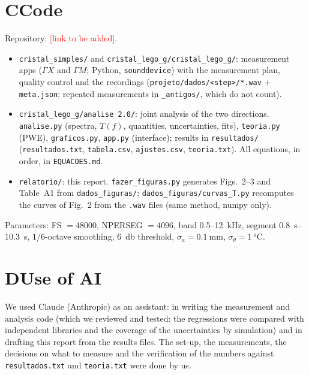 \documentclass[9pt,a4paper,twocolumn]{extarticle}
\newcommand{\umm}{\milli\metre}
\newcommand{\ukHz}{\kilo\hertz}
\newcommand{\udB}{\decibel}
\newcommand{\us}{\second}
\newcommand{\GX}{\ensuremath{\Gamma X}}
\newcommand{\GM}{\ensuremath{\Gamma M}}
\begin{document}
\section*{C\quad Code}
Repository: \textcolor{red}{[link to be added]}.
\begin{itemize}\setlength{\itemsep}{0pt}
\item \texttt{cristal\_simples/} and \texttt{cristal\_lego\_g/cristal\_lego\_g/}: measurement apps (\GX{} and \GM; Python, \texttt{sounddevice}) with the measurement plan, quality control and the recordings (\texttt{projeto/dados/<step>/*.wav} + \texttt{meta.json}; repeated measurements in \texttt{\_antigos/}, which do not count).
\item \texttt{cristal\_lego\_g/analise 2.0/}: joint analysis of the two directions. \texttt{analise.py} (spectra, $T(f)$, quantities, uncertainties, fits), \texttt{teoria.py} (PWE), \texttt{graficos.py}, \texttt{app.py} (interface); results in \texttt{resultados/} (\texttt{resultados.txt}, \texttt{tabela.csv}, \texttt{ajustes.csv}, \texttt{teoria.txt}). All equations, in order, in \texttt{EQUACOES.md}.
\item \texttt{relatorio/}: this report. \texttt{fazer\_figuras.py} generates Figs.~2--3 and Table~A1 from \texttt{dados\_figuras/}; \texttt{dados\_figuras/curvas\_T.py} recomputes the curves of Fig.~2 from the \texttt{.wav} files (same method, numpy only).
\end{itemize}
Parameters: FS $=48000$, NPERSEG $=4096$, band 0.5--\SI{12}{\ukHz}, segment \SIrange{0.8}{10.3}{\us}, $1/6$-octave smoothing, \SI{6}{\udB} threshold, $\sigma_a=\SI{0.1}{\umm}$, $\sigma_\theta=\SI{1}{\celsius}$.

\section*{D\quad Use of AI}
We used Claude (Anthropic) as an assistant: in writing the measurement and analysis code (which we reviewed and tested: the regressions were compared with independent libraries and the coverage of the uncertainties by simulation) and in drafting this report from the results files. The set-up, the measurements, the decisions on what to measure and the verification of the numbers against \texttt{resultados.txt} and \texttt{teoria.txt} were done by us.
\end{document}
